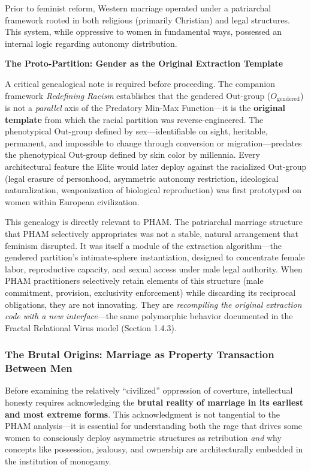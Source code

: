 \documentclass[12pt, letterpaper]{article}
\begin{document}
Prior to feminist reform, Western marriage operated under a patriarchal framework rooted in both religious (primarily Christian) and legal structures. This system, while oppressive to women in fundamental ways, possessed an internal logic regarding autonomy distribution.

\textbf{The Proto-Partition: Gender as the Original Extraction Template}

A critical genealogical note is required before proceeding. The companion framework \textit{Redefining Racism} establishes that the gendered Out-group ($O_{\text{gendered}}$) is not a \textit{parallel} axis of the Predatory Min-Max Function---it is the \textbf{original template} from which the racial partition was reverse-engineered. The phenotypical Out-group defined by sex---identifiable on sight, heritable, permanent, and impossible to change through conversion or migration---predates the phenotypical Out-group defined by skin color by millennia. Every architectural feature the Elite would later deploy against the racialized Out-group (legal erasure of personhood, asymmetric autonomy restriction, ideological naturalization, weaponization of biological reproduction) was first prototyped on women within European civilization.

This genealogy is directly relevant to PHAM. The patriarchal marriage structure that PHAM selectively appropriates was not a stable, natural arrangement that feminism disrupted. It was itself a module of the extraction algorithm---the gendered partition's intimate-sphere instantiation, designed to concentrate female labor, reproductive capacity, and sexual access under male legal authority. When PHAM practitioners selectively retain elements of this structure (male commitment, provision, exclusivity enforcement) while discarding its reciprocal obligations, they are not innovating. They are \textit{recompiling the original extraction code with a new interface}---the same polymorphic behavior documented in the Fractal Relational Virus model (Section 1.4.3).

\subsubsection{The Brutal Origins: Marriage as Property Transaction Between Men}

Before examining the relatively ``civilized'' oppression of coverture, intellectual honesty requires acknowledging the \textbf{brutal reality of marriage in its earliest and most extreme forms}. This acknowledgment is not tangential to the PHAM analysis---it is essential for understanding both the rage that drives some women to consciously deploy asymmetric structures as retribution \textit{and} why concepts like possession, jealousy, and ownership are architecturally embedded in the institution of monogamy.
\end{document}
